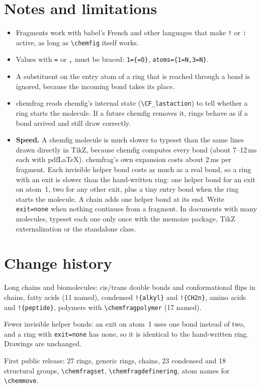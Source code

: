 \documentclass[11pt]{article}
\newcommand\cs[1]{\texttt{\textbackslash#1}}
\newcommand\key[1]{\texttt{\color{cfcode}#1}}
\newcommand\frag[1]{\texttt{!\{#1\}}}
\newcommand\pkg[1]{\textsf{#1}}
\begin{document}
\section{Notes and limitations}
\begin{itemize}
  \item Fragments work with \pkg{babel}'s French and other languages that
        make \verb|!| or \verb|:| active, as long as \cs{chemfig} itself works.
  \item Values with \verb|=| or \verb|,| must be braced:
        \verb|1={=O}|, \verb|atoms={1=N,3=N}|.
  \item A substituent on the entry atom of a ring that is reached through a
        bond is ignored, because the incoming bond takes its place.
  \item \pkg{chemfrag} reads \pkg{chemfig}'s internal state
        (\verb|\CF_lastaction|) to tell whether a ring starts the molecule. If
        a future \pkg{chemfig} removes it, rings behave as if a bond arrived
        and still draw correctly.
  \item \textbf{Speed.} A \pkg{chemfig} molecule is much slower to typeset
        than the same lines drawn directly in TikZ, because \pkg{chemfig}
        computes every bond (about 7--12\,ms each with pdf\LaTeX).
        \pkg{chemfrag}'s own expansion costs about 2\,ms per fragment. Each
        invisible helper bond costs as much as a real bond, so a ring with an
        exit is slower than the hand-written ring:
        one helper bond for an exit on atom~1, two for any other exit, plus a
        tiny entry bond when the ring starts the molecule. A chain adds one
        helper bond at its end. Write \key{exit=none} when nothing continues
        from a fragment. In documents with many molecules, typeset each one
        only once with the \pkg{memoize} package, TikZ externalization or the
        \pkg{standalone} class.
\end{itemize}

\section{Change history}
\begin{description}[font=\sffamily\bfseries]
  \item[1.1.0 (2026-11-25)] Long chains and biomolecules: cis/trans double
    bonds and conformational flips in chains, fatty acids (11 named),
    condensed \frag{alkyl} and \frag{CH2n}, amino acids and \frag{peptide},
    polymers with \cs{chemfragpolymer} (17 named).
  \item[1.0.1 (2026-11-25)] Fewer invisible helper bonds: an exit on atom~1
    uses one bond instead of two, and a ring with \key{exit=none} has none,
    so it is identical to the hand-written ring. Drawings are unchanged.
  \item[1.0.0 (2026-11-25)] First public release: 27 rings, generic rings,
    chains, 23 condensed and 18 structural groups, \cs{chemfragset},
    \cs{chemfragdefinering}, atom names for \cs{chemmove}.
\end{description}
\end{document}
